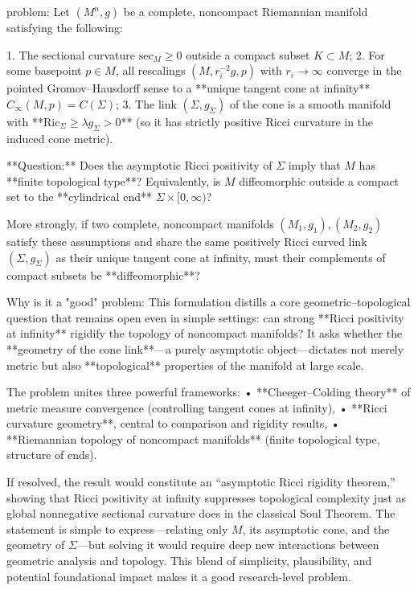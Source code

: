 problem:  
Let \( (M^n, g) \) be a complete, noncompact Riemannian manifold satisfying the following:  

1. The sectional curvature \( \mathrm{sec}_M \ge 0 \) outside a compact subset \( K \subset M \);  
2. For some basepoint \(p \in M\), all rescalings \( (M, r_i^{-2} g, p) \) with \(r_i \to \infty\) converge in the pointed Gromov–Hausdorff sense to a **unique tangent cone at infinity** \( C_\infty(M,p) = C(\Sigma) \);  
3. The link \( (\Sigma, g_\Sigma) \) of the cone is a smooth manifold with **\(\mathrm{Ric}_\Sigma \ge \lambda g_\Sigma > 0\)** (so it has strictly positive Ricci curvature in the induced cone metric).

**Question:**  
Does the asymptotic Ricci positivity of \( \Sigma \) imply that \( M \) has **finite topological type**?  
Equivalently, is \( M \) diffeomorphic outside a compact set to the **cylindrical end** \( \Sigma \times [0,\infty) \)?  

More strongly, if two complete, noncompact manifolds \( (M_1,g_1) , (M_2,g_2) \) satisfy these assumptions and share the same positively Ricci curved link \( (\Sigma, g_\Sigma) \) as their unique tangent cone at infinity, must their complements of compact subsets be **diffeomorphic**?  

Why is it a "good" problem:  
This formulation distills a core geometric–topological question that remains open even in simple settings: can strong **Ricci positivity at infinity** rigidify the topology of noncompact manifolds? It asks whether the **geometry of the cone link**—a purely asymptotic object—dictates not merely metric but also **topological** properties of the manifold at large scale.  

The problem unites three powerful frameworks:  
• **Cheeger–Colding theory** of metric measure convergence (controlling tangent cones at infinity),  
• **Ricci curvature geometry**, central to comparison and rigidity results,  
• **Riemannian topology of noncompact manifolds** (finite topological type, structure of ends).  

If resolved, the result would constitute an “asymptotic Ricci rigidity theorem,” showing that Ricci positivity at infinity suppresses topological complexity just as global nonnegative sectional curvature does in the classical Soul Theorem. The statement is simple to express—relating only \(M\), its asymptotic cone, and the geometry of \(\Sigma\)—but solving it would require deep new interactions between geometric analysis and topology. This blend of simplicity, plausibility, and potential foundational impact makes it a good research-level problem.